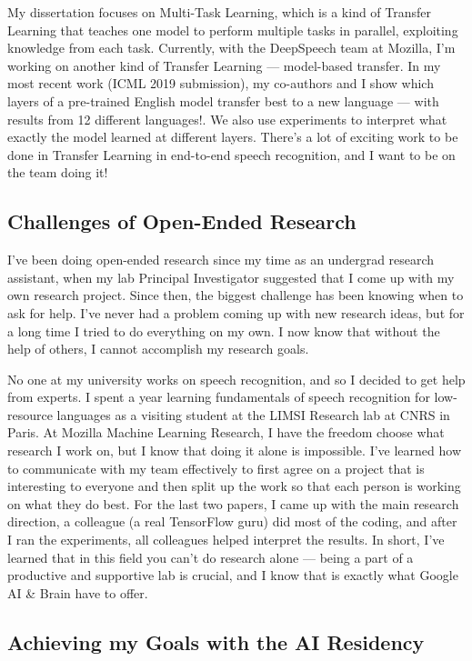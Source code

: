 \documentclass[12pt,a4paper]{article}
\begin{document}
My dissertation focuses on Multi-Task Learning, which is a kind of Transfer Learning that teaches one model to perform multiple tasks in parallel, exploiting knowledge from each task. Currently, with the DeepSpeech team at Mozilla, I'm working on another kind of Transfer Learning --- model-based transfer. In my most recent work (ICML 2019 submission), my co-authors and I show which layers of a pre-trained English model transfer best to a new language --- with results from 12 different languages!. We also use experiments to interpret what exactly the model learned at different layers. There's a lot of exciting work to be done in Transfer Learning in end-to-end speech recognition, and I want to be on the team doing it!


\subsection*{Challenges of Open-Ended Research}
I've been doing open-ended research since my time as an undergrad research assistant, when my lab Principal Investigator suggested that I come up with my own research project. Since then, the biggest challenge has been knowing when to ask for help. I've never had a problem coming up with new research ideas, but for a long time I tried to do everything on my own. I now know that without the help of others, I cannot accomplish my research goals.

No one at my university works on speech recognition, and so I decided to get help from experts. I spent a year learning fundamentals of speech recognition for low-resource languages as a visiting student at the LIMSI Research lab at CNRS in Paris. At Mozilla Machine Learning Research, I have the freedom choose what research I work on, but I know that doing it alone is impossible. I've learned how to communicate with my team effectively to first agree on a project that is interesting to everyone and then split up the work so that each person is working on what they do best. For the last two papers, I came up with the main research direction, a colleague (a real TensorFlow guru) did most of the coding, and after I ran the experiments, all colleagues helped interpret the results. In short, I've learned that in this field you can't do research alone --- being a part of a productive and supportive lab is crucial, and I know that is exactly what Google AI \& Brain have to offer.

\subsection*{Achieving my Goals with the AI Residency}
\end{document}
